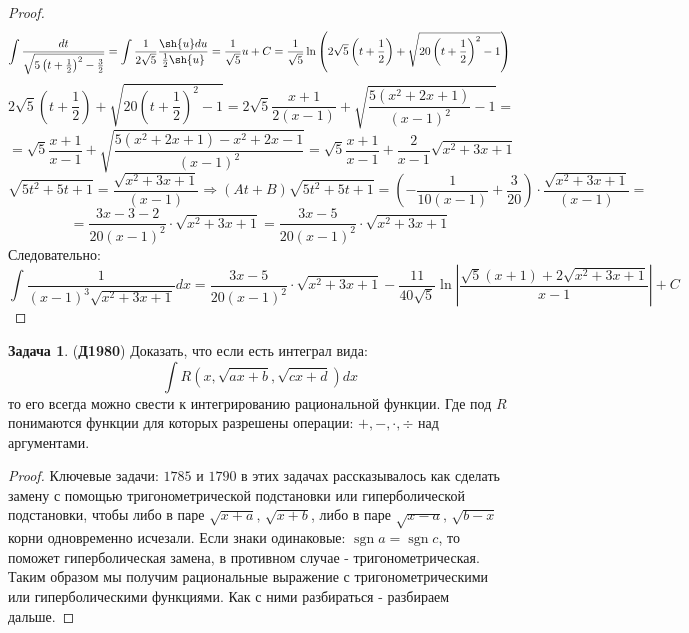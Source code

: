 \documentclass[12pt]{article}
\theoremstyle{definition}
\newtheorem{problem}{Задача}
\DeclareMathOperator{\sgn}{sgn}
\DeclareMathOperator{\dint}{\displaystyle\int}
\begin{document}
\begin{proof}
$$	$$
	$$
		 \dint \dfrac{dt}{\sqrt{5\left(t + \tfrac{1}{2}\right)^2 - \tfrac{3}{2}}} = \dint \dfrac{1}{2\sqrt{5}}\dfrac{\sh{u}du}{\tfrac{1}{2}\sh{u}} = \dfrac{1}{\sqrt{5}}u + C = \dfrac{1}{\sqrt{5}}\ln{\left(2\sqrt{5}\left(t + \dfrac{1}{2}\right) + \sqrt{20\left(t + \dfrac{1}{2}\right)^2 - 1}\right)}
	$$
	$$
		2\sqrt{5}\left(t + \dfrac{1}{2}\right) + \sqrt{20\left(t + \dfrac{1}{2}\right)^2 - 1} = 2\sqrt{5}\dfrac{x +1}{2(x-1)} + \sqrt{\dfrac{5(x^2 + 2x + 1)}{(x-1)^2} - 1} = 
	$$
	$$
		= \sqrt{5}\dfrac{x +1}{x-1} + \sqrt{\dfrac{5(x^2 + 2x + 1) - x^2 + 2x -1}{(x-1)^2}} = \sqrt{5}\dfrac{x + 1}{x-1} + \dfrac{2}{x-1}\sqrt{x^2 + 3x + 1}
	$$
	$$
		\sqrt{5t^2 + 5t + 1} =\dfrac{\sqrt{x^2 + 3x + 1}}{(x-1)} \Rightarrow (At + B)\sqrt{5t^2 + 5t + 1} =  \left(-\dfrac{1}{10(x-1)} + \dfrac{3}{20}\right){\cdot} \dfrac{\sqrt{x^2 + 3x + 1}}{(x-1)} = 
	$$
	$$
		=	\dfrac{3x - 3 - 2}{20(x-1)^2}{\cdot}\sqrt{x^2 + 3x + 1} = \dfrac{3x - 5}{20(x-1)^2}{\cdot}\sqrt{x^2 + 3x + 1}
	$$
	Следовательно:
	$$
		\dint \dfrac{1}{(x-1)^3\sqrt{x^2 + 3x + 1}}dx = \dfrac{3x - 5}{20(x-1)^2}{\cdot}\sqrt{x^2 + 3x + 1} - \dfrac{11}{40\sqrt{5}}\ln{\left| \dfrac{\sqrt{5}(x+ 1) + 2\sqrt{x^2 + 3x +1}}{x-1}\right|} + C
	$$
\end{proof}

\begin{problem}(\textbf{Д1980})
	Доказать, что если есть интеграл вида:
	$$
		\dint R\left(x, \sqrt{ax + b}, \sqrt{cx + d}\right)dx
	$$
	то его всегда можно свести к интегрированию рациональной функции. Где под $R$ понимаются функции для которых разрешены операции: $+, -, \cdot, \div$ над аргументами.
\end{problem}
\begin{proof}
	Ключевые задачи: $1785$ и $1790$ в этих задачах рассказывалось как сделать замену с помощью тригонометрической подстановки или гиперболической подстановки, чтобы либо в паре $\sqrt{x +a}, \, \sqrt{x +b}$, либо в паре $\sqrt{x -a}, \, \sqrt{b-x}$ корни одновременно исчезали. Если знаки одинаковые: $\sgn{a} = \sgn{c}$, то поможет гиперболическая замена, в противном случае - тригонометрическая. Таким образом мы получим рациональные выражение с тригонометрическими или гиперболическими функциями. Как с ними разбираться - разбираем дальше.
\end{proof}
\end{document}
